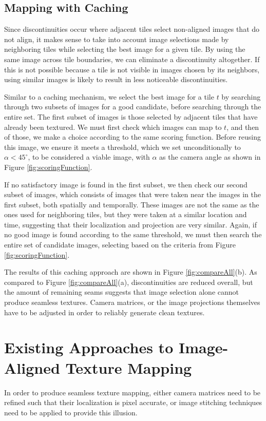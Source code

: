 \documentclass[10pt,twocolumn,letterpaper]{article}
\begin{document}
\subsection{Mapping with Caching}
\label{sec:mappingWithCaching}
Since discontinuities occur where adjacent tiles select non-aligned
images that do not align, it makes sense to take into account image
selections made by neighboring tiles while selecting the best image
for a given tile. By using the same image across tile boundaries, we
can eliminate a discontinuity altogether. If this is not possible
because a tile is not visible in images chosen by its neighbors, using
similar images is likely to result in less noticeable discontinuities.

Similar to a caching mechanism, we select the best image for a tile
$t$ by searching through two subsets of images for a good candidate,
before searching through the entire set. The first subset of images is
those selected by adjacent tiles that have already been textured. We
must first check which images can map to $t$, and then of those, we
make a choice according to the same scoring function. Before reusing
this image, we ensure it meets a threshold, which we set
unconditionally to $\alpha < 45^\circ$, to be considered a viable
image, with $\alpha$ as the camera angle as shown in Figure
\ref{fig:scoringFunction}.

If no satisfactory image is found in the first subset, we then check
our second subset of images, which consists of images that were taken
near the images in the first subset, both spatially and
temporally. These images are not the same as the ones used for
neighboring tiles, but they were taken at a similar location and time,
suggesting that their localization and projection are very
similar. Again, if no good image is found according to the same
threshold, we must then search the entire set of candidate images,
selecting based on the criteria from Figure \ref{fig:scoringFunction}.

The results of this caching approach are shown in Figure
\ref{fig:compareAll}(b). As compared to Figure
\ref{fig:compareAll}(a), discontinuities are reduced overall, but
the amount of remaining seams suggests that image selection alone
cannot produce seamless textures. Camera matrices, or the image
projections themselves have to be adjusted in order to reliably
generate clean textures.

\section{Existing Approaches to Image-Aligned Texture Mapping}
\label{sec:existingApproaches}
In order to produce seamless texture mapping, either camera matrices
need to be refined such that their localization is pixel accurate, or
image stitching techniques need to be applied to provide this
illusion.
\end{document}
